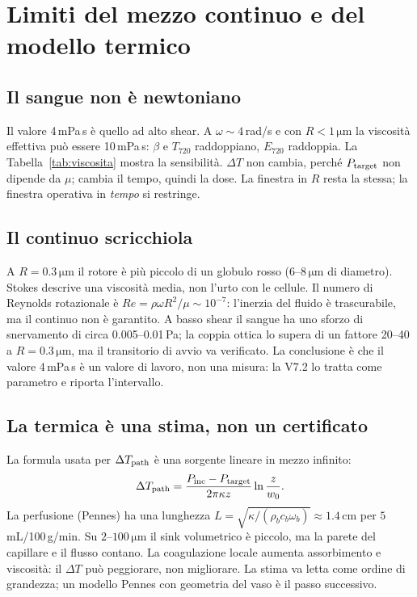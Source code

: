 \documentclass[11pt,a4paper]{article}
\providecommand{\micro}{}
\renewcommand{\micro}{\ensuremath{\mathrm{\mu}}}
\begin{document}
\section{Limiti del mezzo continuo e del modello termico}
\label{sec:limiti}

\subsection{Il sangue non è newtoniano}

Il valore 4\,mPa\,s è quello ad alto shear. A $\omega\sim4$\,rad/s e con
$R<1\,\micro$m la viscosità effettiva può essere 10\,mPa\,s: $\beta$ e
$T_{720}$ raddoppiano, $E_{720}$ raddoppia. La Tabella~\ref{tab:viscosita}
mostra la sensibilità. $\Delta T$ non cambia, perché $P_{\rm target}$ non
dipende da $\mu$; cambia il tempo, quindi la dose. La finestra in $R$ resta
la stessa; la finestra operativa in \emph{tempo} si restringe.

\begin{table}[H]
\centering\small

\caption{Sensibilità alla viscosità, 800\,nm, $z=2\,\micro$m, latch a metà
ciclo. $\tau_B$ è la coppia di snervamento stimata con
$\sigma_y=0.01$\,Pa.}
\label{tab:viscosita}
\end{table}

\subsection{Il continuo scricchiola}

A $R=0.3\,\micro$m il rotore è più piccolo di un globulo rosso
(6--8\,$\micro$m di diametro). Stokes descrive una viscosità media, non
l'urto con le cellule. Il numero di Reynolds rotazionale è
$Re=\rho\omega R^2/\mu\sim10^{-7}$: l'inerzia del fluido è trascurabile, ma
il continuo non è garantito. A basso shear il sangue ha uno sforzo di
snervamento di circa 0.005--0.01\,Pa; la coppia ottica lo supera di un
fattore 20--40 a $R=0.3\,\micro$m, ma il transitorio di avvio va verificato.
La conclusione è che il valore 4\,mPa\,s è un valore di lavoro, non una
misura: la V7.2 lo tratta come parametro e riporta l'intervallo.

\subsection{La termica è una stima, non un certificato}

La formula usata per $\Delta T_{\rm path}$ è una sorgente lineare in mezzo
infinito:
\begin{equation}
\Delta T_{\rm path}=\frac{P_{\rm inc}-P_{\rm target}}
{2\pi\kappa z}\ln\frac{z}{w_0}.
\end{equation}
La perfusione (Pennes) ha una lunghezza
$L=\sqrt{\kappa/(\rho_bc_b\omega_b)}\approx1.4$\,cm per
$5$\,mL/100\,g/min. Su $2$--$100\,\micro$m il sink volumetrico è piccolo, ma
la parete del capillare e il flusso contano. La coagulazione locale aumenta
assorbimento e viscosità: il $\Delta T$ può peggiorare, non migliorare. La
stima va letta come ordine di grandezza; un modello Pennes con geometria del
vaso è il passo successivo.
\end{document}
